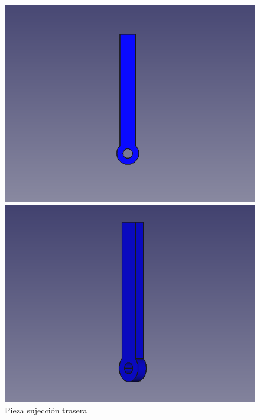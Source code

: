 \begin{figure}[ht!]
	\centering
	\begin{minipage}{0.45\linewidth}
		\centering
		\includegraphics[width=\linewidth]{figs/cap5/trasera1.png}
		\caption*{\centering}
	\end{minipage}
	\hspace{1cm}
	\begin{minipage}{0.45\linewidth}
		\centering
		\includegraphics[width=\linewidth]{figs/cap5/trasera2.png}
		\caption*{\centering}
	\end{minipage}
	\caption{Pieza sujección trasera}
	\label{fig:ptrasera}
\end{figure}


